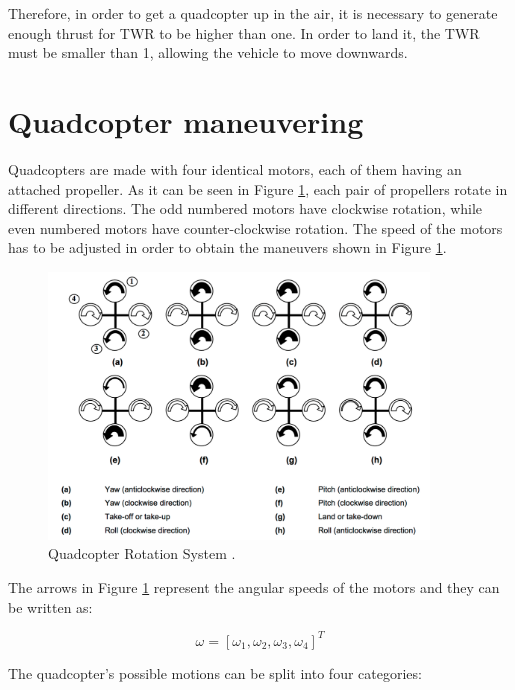 Therefore, in order to get a quadcopter up in the air, it is necessary to generate enough thrust for TWR to be higher than one. In order to land it, the TWR must be smaller than 1, allowing the vehicle to move downwards.

\section{Quadcopter maneuvering}
Quadcopters are made with four identical motors, each of them having an attached propeller. As it can be seen in Figure \ref{rollpitchyaw}, each pair of propellers rotate in different directions. The odd numbered motors have clockwise rotation, while even numbered motors have counter-clockwise rotation. The speed of the motors has to be adjusted in order to obtain the maneuvers shown in Figure \ref{rollpitchyaw}. 

\begin{figure}[H]
  \centering
    \includegraphics[width=0.9\textwidth]{images/rollpitchyaw.png}
	\caption{Quadcopter Rotation System \cite{RPYFig}.}
	\label{rollpitchyaw}
\end{figure}

The arrows in Figure \ref{rollpitchyaw} represent the angular speeds of the motors and they can be written as:

\begin{equation}
	\omega=[\omega_{1}, \omega_{2}, \omega_{3}, \omega_{4}] ^{T}
\end{equation} 

The quadcopter's possible motions can be split into four categories:

